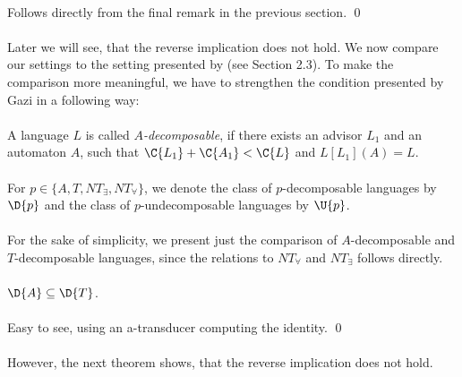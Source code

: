 \paragraph{}
\dokaz Follows directly from the final remark in the previous section. \qed

\paragraph{}
Later we will see, that the reverse implication does not hold. We now compare our settings to the setting presented by \cite{Gazi} (see Section 2.3). To make the comparison more meaningful, we have to strengthen the condition presented by Gazi in a following way:

\paragraph{}
\cdefinicia A language $L$ is called \emph{$A$-decomposable}, if there exists an advisor $L_1$ and an automaton $A$, such that $\C{L_1} + \C{A_1} < \C{L}$ and $L[L_1](A) = L$.

\paragraph{}
\oznacenie For $p \in \{A, T, NT_{\exists}, NT_{\forall}\}$, we denote the class of $p$-decomposable languages by $\D{p}$ and the class of $p$-undecomposable languages by $\U{p}$.

\paragraph{}
For the sake of simplicity, we present just the comparison of $A$-decomposable and $T$-decomposable languages, since the relations to $NT_{\forall}$  and $NT_{\exists}$ follows directly.

\paragraph{}
\cveta $\D{A} \subseteq \D{T}$.

\paragraph{}
\dokaz Easy to see, using an a-transducer computing the identity. \qed

\paragraph{}
However, the next theorem shows, that the reverse implication does not hold.

